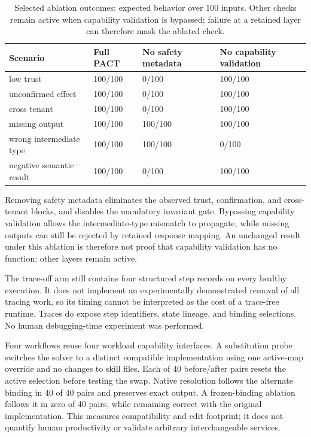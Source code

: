 \documentclass[10pt,twocolumn,a4paper]{article}
\begin{document}
\begin{table}[t]
\centering
\caption{Selected ablation outcomes: expected behavior over 100 inputs. Other checks remain active when capability validation is bypassed; failure at a retained layer can therefore mask the ablated check.}
\label{tab:ablations-extended}
\small
\setlength{\tabcolsep}{4pt}
\renewcommand{\arraystretch}{1.12}
\begin{tabularx}{\textwidth}{@{}Xlll@{}}
\toprule
Scenario & Full PACT & No safety metadata & No capability validation\\
\midrule
low trust & 100/100 & 0/100 & 100/100\\
unconfirmed effect & 100/100 & 0/100 & 100/100\\
cross tenant & 100/100 & 0/100 & 100/100\\
missing output & 100/100 & 100/100 & 100/100\\
wrong intermediate type & 100/100 & 100/100 & 0/100\\
negative semantic result & 100/100 & 0/100 & 100/100\\
\bottomrule
\end{tabularx}
\end{table}
Removing safety metadata eliminates the observed trust, confirmation, and cross-tenant blocks, and disables the mandatory invariant gate. Bypassing capability validation allows the intermediate-type mismatch to propagate, while missing outputs can still be rejected by retained response mapping. An unchanged result under this ablation is therefore not proof that capability validation has no function: other layers remain active.


The trace-off arm still contains four structured step records on every healthy execution. It does not implement an experimentally demonstrated removal of all tracing work, so its timing cannot be interpreted as the cost of a trace-free runtime. Traces do expose step identifiers, state lineage, and binding selections. No human debugging-time experiment was performed.


Four workflows reuse four workload capability interfaces. A substitution probe switches the solver to a distinct compatible implementation using one active-map override and no changes to skill files. Each of 40 before/after pairs resets the active selection before testing the swap. Native resolution follows the alternate binding in 40 of 40 pairs and preserves exact output. A frozen-binding ablation follows it in zero of 40 pairs, while remaining correct with the original implementation. This measures compatibility and edit footprint; it does not quantify human productivity or validate arbitrary interchangeable services.
\end{document}
